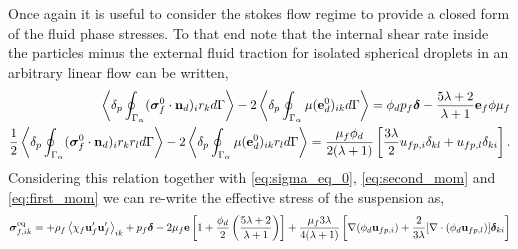 Once again it is useful to consider the stokes flow regime to provide a closed form of the fluid phase stresses. 
To that end note that the internal shear rate inside the particles minus the external fluid traction for isolated spherical droplets in an arbitrary linear flow can be written, 
\begin{align*}
    \left<\delta_{p} \oint_{\Gamma_{\alpha}} (\bm{\sigma}_f^0 \cdot \textbf{n}_d)_ir_k d\Gamma\right> -
    2\left<\delta_{p} \oint_{\Gamma_{\alpha}} {\mu(\textbf{e}_d^0)_{ik}} d\Gamma\right> 
    = 
    \phi_d p_f\bm\delta
    - \frac{5\lambda +2}{\lambda +1}
    \textbf{e}_f \phi \mu_f
    \\
    \frac{1}{2}\left<\delta_{p} \oint_{\Gamma_{\alpha}} (\bm{\sigma}_f^0 \cdot \textbf{n}_d)_ir_kr_l d\Gamma\right> -
    2\left<\delta_{p} \oint_{\Gamma_{\alpha}} {\mu(\textbf{e}_d^0)_{ik} r_l} d\Gamma\right> 
    = 
    \frac{\mu_f\phi_d}{2(\lambda +1) }
    \left[
        \frac{3\lambda}{2} 
        u_{fp,i}\delta_{kl}
        +  u_{fp,l}\delta_{ki}
    \right]. 
\end{align*}
Considering this relation together with \ref{eq:sigma_eq_0}, \ref{eq:second_mom} and \ref{eq:first_mom} we can re-write the effective stress of the suspension as, 
\begin{align*}
    \bm{\sigma}^\text{eq}_{f,ik} =
    + \rho_f\left<\chi_f\textbf{u}_f'\textbf{u}_f'\right>_{ik} 
    + p_f \bm\delta
    - 2 \mu_f \textbf{e}\left[
        1
        +\frac{\phi_d}{2}\left(
            \frac{5\lambda +2}{\lambda +1}
        \right)
    \right]
    + 
    \frac{\mu_f 3\lambda}{4(\lambda +1) }
    \left[
        \mathbf{\nabla} (\phi_d\textbf{u}_{fp,i})
        +  
        \frac{2}{3\lambda} 
        [\mathbf{\nabla}\cdot (\phi_d\textbf{u}_{fp,l})]\bm\delta_{ki}
    \right]
\end{align*} 
